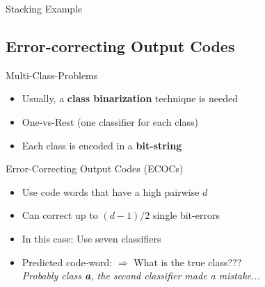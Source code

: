 \begin{frame}{Stacking Example}{}
	\vspace*{-6mm}
	
\end{frame}


\subsection{Error-correcting Output Codes}

\begin{frame}{Multi-Class-Problems}{}
	\begin{itemize}
		\item Usually, a \textbf{class binarization} technique is needed
		\item One-vs-Rest (one classifier for each class)
		\item Each class is encoded in a \textbf{bit-string}
	\end{itemize}
	
	\vspace*{3mm}
\end{frame}


\begin{frame}{Error-Correcting Output Codes (ECOCs)}{}
	\begin{itemize}
		\item Use code words that have a high pairwise  $d$
		\item Can correct up to $(d - 1) / 2$ single bit-errors
		\item In this case: Use seven classifiers
		
		\item Predicted code-word:  $\Rightarrow$ What is the true class??? \\
			\textit{Probably class \textbf{a}, the second classifier made a mistake...}
	\end{itemize}
\end{frame}


